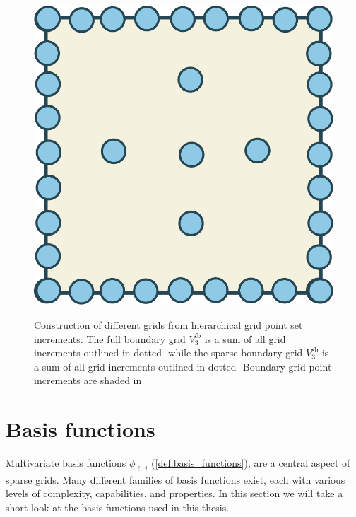 \documentclass[
  a4paper,  %
  twoside,  %
  bibliography=totoc,
  headsepline,
  cleardoublepage=empty,
  parskip=half,
  draft=false
]{scrbook}
\begin{document}
\begin{mdframed}[style=style]
\begin{figure}[H]
\begin{minipage}{0.28\textwidth}
\label{fig:full_grid}
\vspace{4.5mm}
  \includegraphics[width=.8\linewidth]{graphics/sparse_grid}
\label{fig:sparse_grid}
\vspace{2.5mm}
    \end{minipage}
\delimit
\caption{Construction of different grids from hierarchical grid point set increments. The full boundary grid $V^{\text{fb}}_{3}$ is a sum of all grid increments outlined in dotted \greencomma\,\,while the sparse boundary grid $V^{\text{sb}}_{3}$ is a sum of all grid increments outlined in dotted \reddot\,\,Boundary grid point increments are shaded in \greydot}
\label{fig:grid_construction}
\end{figure}
\end{mdframed}

\section{Basis functions}

Multivariate basis functions $\phi_{\underline{\ell},\underline{i}}$ (\cref{def:basis_functions}), are a central aspect of sparse grids.
Many different families of basis functions exist, each with various levels of complexity, capabilities, and properties.
In this section we will take a short look at the basis functions used in this thesis.
\end{document}
